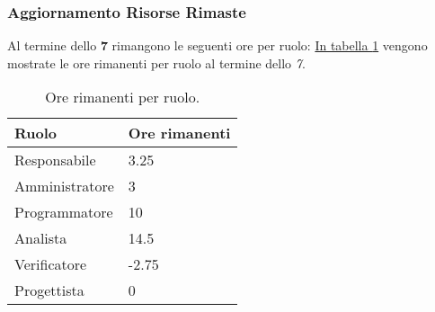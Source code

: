 \subsubsection{Aggiornamento Risorse Rimaste}
\label{sec:AggiornamentoRisorse_Sprint7}
Al termine dello \textbf{ 7} rimangono le seguenti ore per ruolo: \hyperref[tab:sprint7_ore_rimanenti]{In tabella \ref{tab:sprint7_ore_rimanenti}} vengono mostrate le ore rimanenti per ruolo al termine dello \textit{ 7}.

\begin{table}[H]
    \centering
    \begin{tabular}{| l | l |}
    \hline
    \textbf{Ruolo} & 
    \textbf{Ore rimanenti}\\
    \hline
        Responsabile & 3.25\\
    \hline
        Amministratore & 3\\
    \hline
        Programmatore & 10\\
    \hline
        Analista & 14.5\\
    \hline
        Verificatore & -2.75\\
    \hline
        Progettista & 0\\
    \hline
    \end{tabular}
    \caption{Ore rimanenti per ruolo.}
    \label{tab:sprint7_ore_rimanenti} 
\end{table}